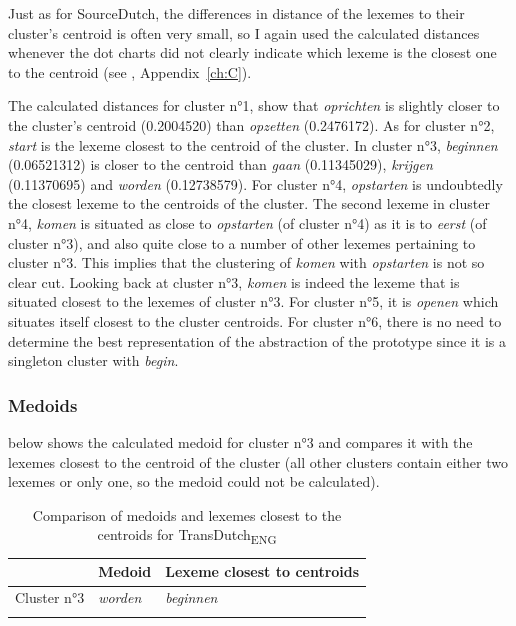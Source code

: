 Just as for SourceDutch, the differences in distance of the lexemes to their cluster’s centroid is often very small, so I again used the calculated distances whenever the dot charts did not clearly indicate which lexeme is the closest one to the centroid (see , Appendix~\ref{ch:C}).

The calculated distances for cluster n°1, show that \textit{oprichten} is slightly closer to the cluster’s centroid (0.2004520) than \textit{opzetten} (0.2476172). As for cluster n°2, \textit{start} is the lexeme closest to the centroid of the cluster. In cluster n°3, \textit{beginnen} (0.06521312) is closer to the centroid than \textit{gaan} (0.11345029), \textit{krijgen} (0.11370695) and \textit{worden} (0.12738579). For cluster n°4, \textit{opstarten} is undoubtedly the closest lexeme to the centroids of the cluster. The second lexeme in cluster n°4, \textit{komen} is situated as close to \textit{opstarten} (of cluster n°4) as it is to \textit{eerst} (of cluster n°3), and also quite close to a number of other lexemes pertaining to cluster n°3. This implies that the clustering of \textit{komen} with \textit{opstarten} is not so clear cut. Looking back at cluster n°3, \textit{komen} is indeed the lexeme that is situated closest to the lexemes of cluster n°3. For cluster n°5, it is \textit{openen} which situates itself closest to the cluster centroids. For cluster n°6, there is no need to determine the best representation of the abstraction of the prototype since it is a singleton cluster with \textit{begin}.

\subsubsection{Medoids}
\label{sec:4.3.3.2}  
 below shows the calculated medoid for cluster n°3 and compares it with the lexemes closest to the centroid of the cluster (all other clusters contain either two lexemes or only one, so the medoid could not be calculated).

\begin{table}
\caption{\label{tab:4:15}Comparison of medoids and lexemes closest to the centroids for TransDutch\textsubscript{ENG}}
\begin{tabularx}{\textwidth}{XXl} 
\lsptoprule
& Medoid & Lexeme closest to centroids\\
\midrule
Cluster n°3 &\itshape worden &\itshape beginnen\\
\lspbottomrule
\end{tabularx}
\end{table}

